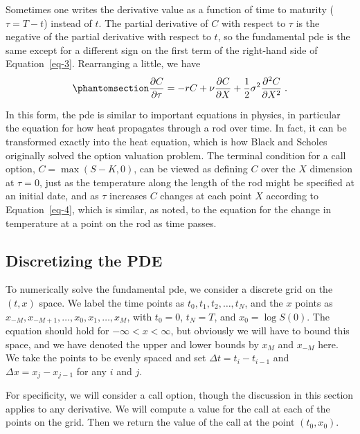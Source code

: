 \documentclass[
  letterpaper,
  DIV=11,
  numbers=noendperiod]{scrartcl}
\theoremstyle{definition}
\theoremstyle{remark}
\begin{document}
Sometimes one writes the derivative value as a function of time to
maturity (\(\tau = T-t\)) instead of \(t\). The partial derivative of
\(C\) with respect to \(\tau\) is the negative of the partial derivative
with respect to \(t\), so the fundamental pde is the same except for a
different sign on the first term of the right-hand side of
Equation~\ref{eq-3}. Rearranging a little, we have
\begin{equation}\phantomsection\label{eq-4}{
\frac{\partial C}{\partial \tau} = -rC + \nu\frac{\partial C}{\partial X}+ \frac{1}{2}\sigma^2\frac{\partial^2 C}{\partial X^2}\;.
}\end{equation}

In this form, the pde is similar to important equations in physics, in
particular the equation for how heat propagates through a rod over time.
In fact, it can be transformed exactly into the heat equation, which is
how Black and Scholes originally solved the option valuation problem.
The terminal condition for a call option, \(C = \max(S-K,0)\), can be
viewed as defining \(C\) over the \(X\) dimension at \(\tau=0\), just as
the temperature along the length of the rod might be specified at an
initial date, and as \(\tau\) increases \(C\) changes at each point
\(X\) according to Equation~\ref{eq-4}, which is similar, as noted, to
the equation for the change in temperature at a point on the rod as time
passes.

\subsection{Discretizing the PDE}\label{discretizing-the-pde}

To numerically solve the fundamental pde, we consider a discrete grid on
the \((t,x)\) space. We label the time points as
\(t_0, t_1, t_2, \ldots, t_N\), and the \(x\) points as
\(x_{-M}, x_{-M+1}, \ldots, x_0, x_1, \ldots, x_M\), with \(t_0=0\),
\(t_N=T\), and \(x_0=\log S(0)\). The equation should hold for
\(-\infty< x < \infty\), but obviously we will have to bound this space,
and we have denoted the upper and lower bounds by \(x_M\) and \(x_{-M}\)
here. We take the points to be evenly spaced and set
\(\Delta t= t_i-t_{i-1}\) and \(\Delta x = x_j -x_{j-1}\) for any \(i\)
and \(j\).

For specificity, we will consider a call option, though the discussion
in this section applies to any derivative. We will compute a value for
the call at each of the points on the grid. Then we return the value of
the call at the point \((t_0,x_0)\).
\end{document}
